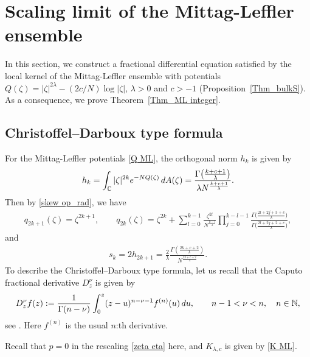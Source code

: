 \documentclass[11pt]{article}
\numberwithin{equation}{section}
\numberwithin{equation}{section}
\newcommand{\C}{{\mathbb C}}
\newcommand{\1}{\chi}
\begin{document}
\setcounter{section}{3}
\section{Scaling limit of the Mittag-Leffler ensemble}

In this section, we construct a fractional differential equation satisfied by the local kernel of the Mittag-Leffler ensemble with potentials $Q(\zeta)=|\zeta|^{2\lambda}-(2c/N)\log|\zeta|$, $\lambda>0$ and $c>-1$ (Proposition~\ref{Thm_bulkS}). As a consequence, we prove Theorem~\ref{Thm_ML integer}.

\subsection{Christoffel--Darboux type formula}
For the Mittag-Leffler potentials \eqref{Q ML}, the orthogonal norm $h_k$ is given by
\begin{gather*}
h_k=\int_\C |\zeta|^{2k} {\rm e}^{-N Q(\zeta)} \, {\rm d}A(\zeta)=\frac{\Gamma\big( \frac{k+c+1}{\lambda} \big)}{\lambda N^{\frac{k+c+1}{\lambda}} } .
\end{gather*}
Then by \eqref{skew op_rad}, we have
\begin{gather} \label{SOP ML}
	q_{2k+1}(\zeta)=\zeta^{2k+1}, \qquad q_{2k}(\zeta)=\zeta^{2k}+ \sum_{l=0}^{k-1} \frac{\zeta^{2l}}{N^{\frac{k-l}{\lambda}}} \prod_{j=0}^{k-l-1} \frac{ \Gamma\big( \frac{2l+2j+3+c}{\lambda} \big) }{ \Gamma\big( \frac{2l+2j+2+c}{\lambda} \big) } ,
\end{gather}
and
\begin{gather} \label{sk ML}
	s_k=2h_{2k+1}=\frac{2}{\lambda } \frac{\Gamma( \frac{2k+c+2}{\lambda} )}{N^{\frac{2k+c+2}{\lambda}} } .
\end{gather}
To describe the Christoffel--Darboux type formula, let us recall that the Caputo fractional derivative $D^\nu_z$ is given by
\begin{gather*}
	D^\nu_z f(z):=\frac{1}{\Gamma(n-\nu)} \int_{0}^{z} (z-u)^{n-\nu-1} f^{(n)}(u) \, {\rm d}u, \qquad n-1 < \nu <n, \quad n \in \mathbb{N},
\end{gather*}
see \cite[Section 2.4]{MR2218073}. Here $f^{(n)}$ is the usual $n$:th derivative.

Recall that $p=0$
in the rescaling \eqref{zeta eta} here,
and $K_{\lambda,c}$ is given by \eqref{K ML}.
\end{document}
